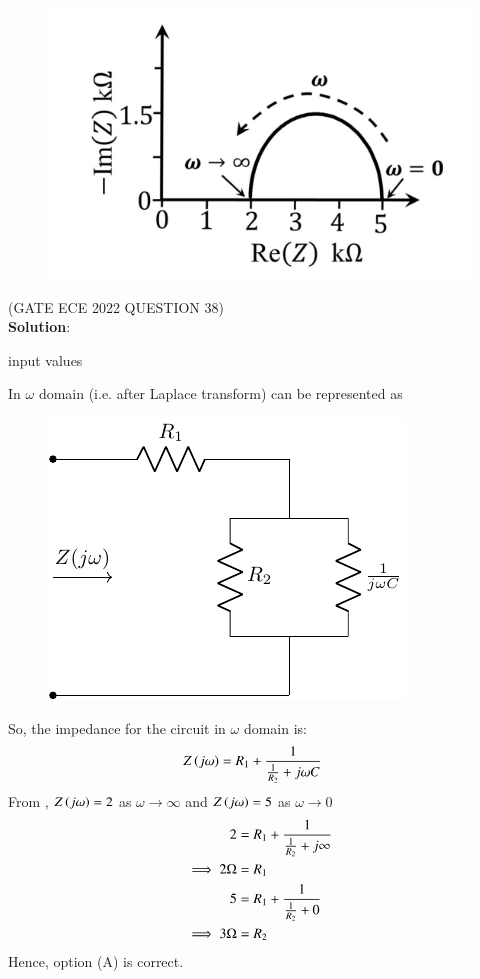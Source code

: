 \documentclass[journal,12pt,twocolumn]{IEEEtran}
\theoremstyle{remark}
\begin{document}
\begin{figure}[h!]
    \includegraphics[width = 0.6\columnwidth]{figs/fig_2.png}
    \caption{}
    \centering
    \label{fig: qn_2_fig}
\end{figure}
\hfill(GATE ECE 2022 QUESTION 38)\\
\textbf{Solution}:\\
\begin{table}[h!] 
\centering

\caption{input values}
\label{tab: Table2022ECE38}
\end{table}
In $ \omega$ domain (i.e. after Laplace transform)  can be represented as 
\begin{figure}[h!]
    \includegraphics[width = 0.6\columnwidth]{figs/answer_fig.pdf}
    \caption{}
    \centering
    \label{fig: ans_1_fig}
\end{figure}
So, the impedance for the circuit in $ \omega$ domain is:
\begin{align}
Z\left(j \omega\right) &= R_1 +  \frac{1}{\frac{1}{R_2}+ j\omega C} \label{eq: ece38_1}
\end{align}
From , $ Z\left(j\omega\right)=2$ as $ \omega \to \infty$ and 
$ Z\left(j\omega\right)=5$ as $ \omega \to 0$
\begin{align}
2 &= R_1 + \frac{1}{\frac{1}{R_2}+ j\infty}\\
\implies 2\text{\ohm} &= R_1 \label{eq: ece382}\\
5 &= R_1 + \frac{1}{\frac{1}{R_2}+0}\\
\implies 3\text{\ohm} &= R_2
\end{align}
Hence, option (A) is correct.
\end{document}
